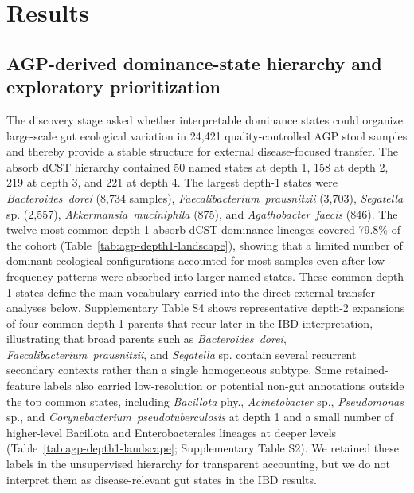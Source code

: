 \documentclass[
  11pt,
]{article}
\newcommand{\taxon}[1]{\emph{#1}}
\begin{document}
\section{Results}\label{cohort-overview}

\subsection{AGP-derived dominance-state hierarchy and exploratory prioritization}\label{agp-derived-dominance-state-hierarchy-and-exploratory-prioritization}

The discovery stage asked whether interpretable dominance states could
organize large-scale gut ecological variation in 24,421
quality-controlled AGP stool samples and thereby provide a stable
structure for external disease-focused transfer. The absorb dCST
hierarchy contained 50 named states at depth 1, 158 at depth 2, 219 at
depth 3, and 221 at depth 4. The largest depth-1 states were
\taxon{Bacteroides~dorei} (8,734 samples),
\taxon{Faecalibacterium~prausnitzii} (3,703), \taxon{Segatella} sp.
(2,557), \taxon{Akkermansia~muciniphila} (875), and
\taxon{Agathobacter~faecis} (846). The twelve most common depth-1
absorb dCST dominance-lineages covered 79.8\% of the cohort
(Table~\ref{tab:agp-depth1-landscape}), showing that a
limited number of dominant ecological configurations accounted for most
samples even after low-frequency patterns were absorbed into larger
named states. These common depth-1 states define the main vocabulary
carried into the direct external-transfer analyses below. Supplementary
Table S4 shows representative depth-2 expansions of four common
depth-1 parents that recur later in the IBD interpretation, illustrating
that broad parents such as \taxon{Bacteroides~dorei},
\taxon{Faecalibacterium~prausnitzii}, and \taxon{Segatella} sp. contain
several recurrent secondary contexts rather than a single homogeneous
subtype. Some retained-feature labels also carried low-resolution or
potential non-gut annotations outside the top common states, including
\taxon{Bacillota} phy., \taxon{Acinetobacter} sp., \taxon{Pseudomonas}
sp., and \taxon{Corynebacterium~pseudotuberculosis} at depth 1 and a
small number of higher-level Bacillota and Enterobacterales lineages at
deeper levels (Table~\ref{tab:agp-depth1-landscape}; Supplementary
Table S2). We
retained these labels in the unsupervised hierarchy for transparent
accounting, but we do not interpret them as disease-relevant gut states
in the IBD results.
\end{document}
